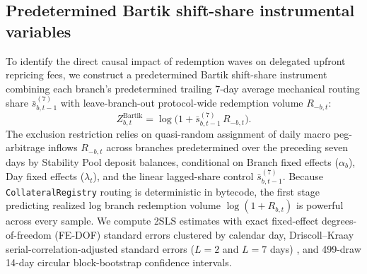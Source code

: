 \subsection{Predetermined Bartik shift-share instrumental variables}\label{subsec:bartik}

To identify the direct causal impact of redemption waves on delegated upfront repricing fees, we construct a predetermined Bartik shift-share instrument \citep{borusyak2022quasi} combining each branch's predetermined trailing 7-day average mechanical routing share $\bar{s}_{b,t-1}^{(7)}$ with leave-branch-out protocol-wide redemption volume $R_{-b,t}$:
\begin{equation}\label{eq:bartik_iv}
Z_{b,t}^{\text{Bartik}} = \log\!\bigl(1 + \bar{s}_{b,t-1}^{(7)}\,R_{-b,t}\bigr).
\end{equation}
The exclusion restriction relies on quasi-random assignment of daily macro peg-arbitrage inflows $R_{-b,t}$ across branches predetermined over the preceding seven days by Stability Pool deposit balances, conditional on Branch fixed effects ($\alpha_b$), Day fixed effects ($\lambda_t$), and the linear lagged-share control $\bar{s}_{b,t-1}^{(7)}$. Because \texttt{CollateralRegistry} routing is deterministic in bytecode, the first stage predicting realized log branch redemption volume $\log(1 + R_{b,t})$ is powerful across every sample. We compute 2SLS estimates with exact fixed-effect degrees-of-freedom (FE-DOF) standard errors clustered by calendar day, Driscoll--Kraay serial-correlation-adjusted standard errors ($L = 2$ and $L = 7$ days) \citep{driscoll1998consistent}, and 499-draw 14-day circular block-bootstrap confidence intervals.

